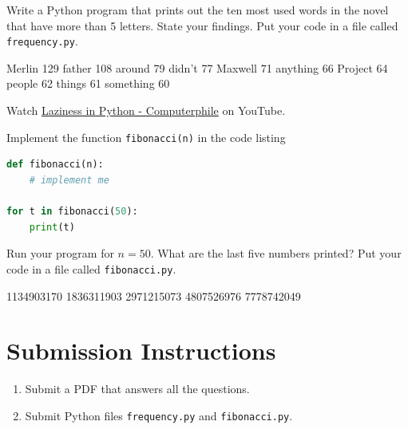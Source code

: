 \documentclass{homework}
\begin{document}
Write a Python program that prints out the ten most used words in
the novel that have more than 5 letters. State your findings. Put
your code in a file called \texttt{frequency.py}.

\begin{sol}
Merlin 129
father 108
around 79
didn't 77
Maxwell 71
anything 66
Project 64
people 62
things 61
something 60
\end{sol}

\question Watch \href{https://www.youtube.com/watch?v=5jwV3zxXc8E}{Laziness
  in Python - Computerphile} on YouTube.

Implement the function \texttt{fibonacci(n)} in the code listing

\begin{lstlisting}[language=python, label=fib, caption={A Python 3 program to print out the first $n \geq 0$ Fibonacci numbers.}]
def fibonacci(n):
    # implement me

for t in fibonacci(50):
    print(t)
\end{lstlisting}

Run your program for $n=50$. What are the last five numbers
printed? Put your code in a file called \texttt{fibonacci.py}.

\begin{sol}
1134903170
1836311903
2971215073
4807526976
7778742049
\end{sol}

\section*{Submission Instructions}

\begin{enumerate}
  \item Submit a PDF that answers all the questions.
  \item Submit Python files \eg \texttt{frequency.py} and
        \texttt{fibonacci.py}.
\end{enumerate}
\end{document}
